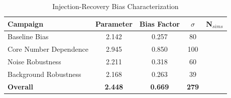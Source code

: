\begin{table}[H]
\centering
\caption{Injection-Recovery Bias Characterization}
\label{tab:injection_recovery_bias}
\begin{tabular}{lcccc}
\toprule
Campaign & Parameter & Bias Factor & $\sigma$ & N$_{sims}$ \\
\midrule
Baseline Bias & 2.142 & 0.257 & 80 \\
Core Number Dependence & 2.945 & 0.850 & 100 \\
Noise Robustness & 2.211 & 0.318 & 60 \\
Background Robustness & 2.168 & 0.263 & 39 \\
\midrule
\textbf{Overall} & \textbf{2.448} & \textbf{0.669} & \textbf{279} \\
\bottomrule
\end{tabular}
\end{table}